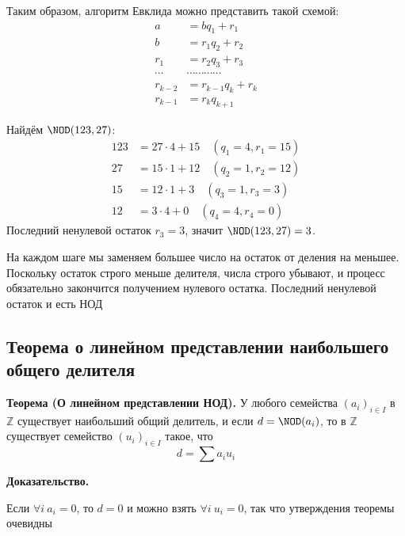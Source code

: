 \documentclass[a4paper,12pt]{article}
\theoremstyle{definition}
\theoremstyle{plain}
\theoremstyle{remark}
\begin{document}
	Таким образом, алгоритм Евклида можно представить такой схемой:
	\begin{align*}
	a &= bq_1 + r_1 \\
	b &= r_1q_2 + r_2 \\
	r_1 &= r_2q_3 + r_3 \\
	\cdots &\cdots \cdots \cdots \cdots \\
	r_{k-2} &= r_{k-1}q_k + r_k \\
	r_{k-1} &= r_kq_{k+1}
	\end{align*}
	
	\begin{tcolorbox}[colback=gray!5, colframe=gray!50, title=Пример работы алгоритма Евклида]
	Найдём $\NOD(123, 27)$:
	\begin{align*}
	123 &= 27 \cdot 4 + 15 \quad (q_1=4, r_1=15) \\
	27 &= 15 \cdot 1 + 12 \quad (q_2=1, r_2=12) \\
	15 &= 12 \cdot 1 + 3 \quad (q_3=1, r_3=3) \\
	12 &= 3 \cdot 4 + 0 \quad (q_4=4, r_4=0)
	\end{align*}
	Последний ненулевой остаток $r_3 = 3$, значит $\NOD(123, 27) = 3$.
	\end{tcolorbox}
	
	\begin{tcolorbox}[colback=green!5, colframe=green!50!black, title=Пояснение]
	На каждом шаге мы заменяем большее число на остаток от деления на меньшее. Поскольку остаток строго меньше делителя, числа строго убывают, и процесс обязательно закончится получением нулевого остатка. Последний ненулевой остаток и есть НОД
	\end{tcolorbox}
	
	\subsection{Теорема о линейном представлении наибольшего общего делителя}
	
	\noindent \textbf{Теорема (О линейном представлении НОД).}
	У любого семейства $(a_i)_{i \in I}$ в $\mathbb{Z}$ существует наибольший общий делитель, и если $d = \NOD(a_i)$, то в $\mathbb{Z}$ существует семейство $(u_i)_{i \in I}$ такое, что
	\[
	d = \sum a_i u_i
	\]
	
	\medskip
	\noindent \textbf{Доказательство.}
	
	Если $\forall i \ a_i = 0$, то $d = 0$ и можно взять $\forall i \ u_i = 0$, так что утверждения теоремы очевидны
	
\end{document}
